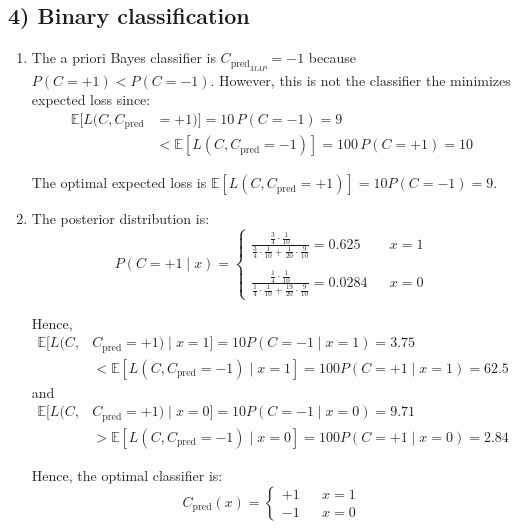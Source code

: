 \documentclass[14pt]{extarticle}
\begin{document}
\subsection*{4) Binary classification}

\begin{enumerate}
\item
The a priori Bayes classifier is $C_{\mathrm{pred}_{MAP}}=-1$ because $P(C=+1)<P(C=-1)$.
However, this is not the classifier the minimizes expected loss since: 
\begin{align*}
\mathbb{E}[L(C,C_{\mathrm{pred}}&=+1)] = 10\, P(C=-1) = 9 \\
                                &< \mathbb{E}[L(C,C_{\mathrm{pred}}=-1)] = 100\, P(C=+1) = 10
\end{align*}


The optimal expected loss is $\mathbb{E}[L(C,C_{\mathrm{pred}}=+1)]=10 P(C=-1)=9$.

\item
The posterior distribution is:
\begin{equation*}
P(C=+1 \mid x)=\left\{ 
\begin{array}{lll}
\frac{\frac{3}{4} \cdot \frac{1}{10}}{\frac{3}{4} \cdot \frac{1}{10} + \frac{1}{20} \cdot \frac{9}{10}} = 0.625  &  & x = 1\\
                                                                                                                 &  &  \\ 
\frac{\frac{1}{4} \cdot \frac{1}{10}}{\frac{1}{4} \cdot \frac{1}{10} + \frac{19}{20} \cdot \frac{9}{10}} = 0.0284&  & x=0
\end{array}
\right.
\end{equation*}

Hence,
\begin{align*}
\mathbb{E}[L(C,&C_{\mathrm{pred}}=+1) \mid x=1]=10 P(C=-1 \mid x=1)=3.75 \\
&< \mathbb{E}[L(C,C_{\mathrm{pred}}=-1) \mid x=1]
=100 P(C=+1 \mid x=1)=62.5
\end{align*}
and
\begin{align*}
\mathbb{E}[L(C,&C_{\mathrm{pred}}=+1) \mid x=0]=10 P(C=-1 \mid x=0)=9.71\\
&> \mathbb{E}[L(C,C_{\mathrm{pred}}=-1) \mid x=0]
=100 P(C=+1 \mid x=0)=2.84
\end{align*}

Hence, the optimal classifier is:
\begin{equation*}
C_{\mathrm{pred}}(x)=\left\{
\begin{array}{rrr}
+1 &  & x=1 \\ 
-1 &  & x=0
\end{array}
\right. 
\end{equation*}


\end{enumerate}
\end{document}
